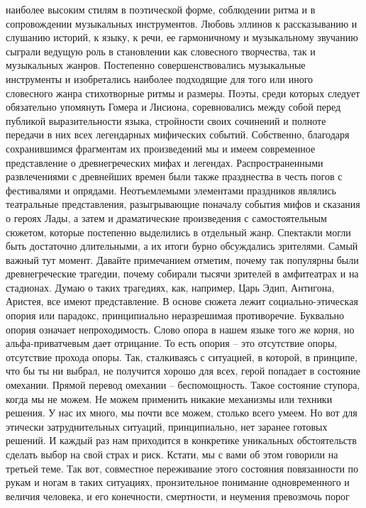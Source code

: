 наиболее высоким стилям в поэтической форме, соблюдении ритма и в сопровождении
музыкальных инструментов. Любовь эллинов к рассказыванию и слушанию историй, к
языку, к речи, ее гармоничному и музыкальному звучанию сыграли ведущую роль в
становлении как словесного творчества, так и музыкальных жанров. Постепенно
совершенствовались музыкальные инструменты и изобретались наиболее подходящие
для того или иного словесного жанра стихотворные ритмы и размеры. Поэты, среди
которых следует обязательно упомянуть Гомера и Лисиона, соревновались между
собой перед публикой выразительности языка, стройности своих сочинений и полноте
передачи в них всех легендарных мифических событий. Собственно, благодаря
сохранившимся фрагментам их произведений мы и имеем современное представление о
древнегреческих мифах и легендах. Распространенными развлечениями с древнейших
времен были также празднества в честь погов с фестивалями и опрядами.
Неотъемлемыми элементами праздников являлись театральные представления,
разыгрывающие поначалу события мифов и сказания о героях Лады, а затем и
драматические произведения с самостоятельным сюжетом, которые постепенно
выделились в отдельный жанр. Спектакли могли быть достаточно длительными, а их
итоги бурно обсуждались зрителями. Самый важный тут момент. Давайте примечанием
отметим, почему так популярны были древнегреческие трагедии, почему собирали
тысячи зрителей в амфитеатрах и на стадионах. Думаю о таких трагедиях, как,
например, Царь Эдип, Антигона, Аристея, все имеют представление. В основе сюжета
лежит социально-этическая опория или парадокс, принципиально неразрешимая
противоречие. Буквально опория означает непроходимость. Слово опора в нашем
языке того же корня, но альфа-приватчевым дает отрицание. То есть опория – это
отсутствие опоры, отсутствие прохода опоры. Так, сталкиваясь с ситуацией, в
которой, в принципе, что бы ты ни выбрал, не получится хорошо для всех, герой
попадает в состояние омехании. Прямой перевод омехании – беспомощность. Такое
состояние ступора, когда мы не можем. Не можем применить никакие механизмы или
техники решения. У нас их много, мы почти все можем, столько всего умеем. Но вот
для этически затруднительных ситуаций, принципиально, нет заранее готовых
решений. И каждый раз нам приходится в конкретике уникальных обстоятельств
сделать выбор на свой страх и риск. Кстати, мы с вами об этом говорили на
третьей теме. Так вот, совместное переживание этого состояния повязанности по
рукам и ногам в таких ситуациях, пронзительное понимание одновременного и
величия человека, и его конечности, смертности, и неумения превозмочь порог
